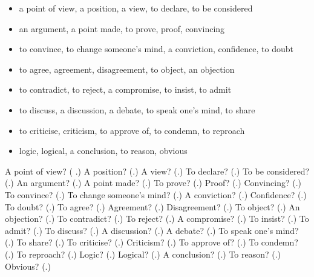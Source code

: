 \begin{itemize}
\raggedright
  \item a point of view, a position, a view, to declare, to be considered
  \item an argument, a point made, to prove, proof, convincing
  \item to convince, to change someone’s mind, a conviction, confidence, to doubt
  \item to agree, agreement, disagreement, to object, an objection
  \item to contradict, to reject, a compromise, to insist, to admit
  \item to discuss, a discussion, a debate, to speak one’s mind, to share
  \item to criticise, criticism, to approve of, to condemn, to reproach
  \item logic, logical, a conclusion, to reason, obvious
\end{itemize}

\begin{tcolorbox}[breakable,colback=teal!4,colframe=teal!35!black,title={Before you move on}]
A point of view? (\textbf{ }.) A position? (\textbf{}.) A view? (\textbf{}.) To declare? (\textbf{}.) To be considered? (\textbf{}.) An argument? (\textbf{}.) A point made? (\textbf{}.) To prove? (\textbf{}.) Proof? (\textbf{}.) Convincing? (\textbf{}.) To convince? (\textbf{}.) To change someone’s mind? (\textbf{}.) A conviction? (\textbf{}.) Confidence? (\textbf{}.) To doubt? (\textbf{}.) To agree? (\textbf{}.) Agreement? (\textbf{}.) Disagreement? (\textbf{}.) To object? (\textbf{}.) An objection? (\textbf{}.) To contradict? (\textbf{}.) To reject? (\textbf{}.) A compromise? (\textbf{}.) To insist? (\textbf{}.) To admit? (\textbf{}.) To discuss? (\textbf{}.) A discussion? (\textbf{}.) A debate? (\textbf{}.) To speak one’s mind? (\textbf{}.) To share? (\textbf{}.) To criticise? (\textbf{}.) Criticism? (\textbf{}.) To approve of? (\textbf{}.) To condemn? (\textbf{}.) To reproach? (\textbf{}.) Logic? (\textbf{}.) Logical? (\textbf{}.) A conclusion? (\textbf{}.) To reason? (\textbf{}.) Obvious? (\textbf{}.)
\end{tcolorbox}
